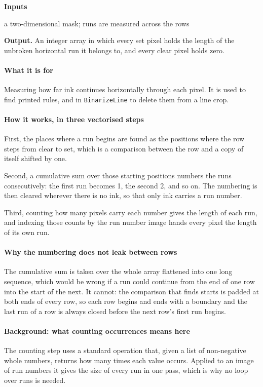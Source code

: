 \noindent\textbf{Inputs}
\begin{description}[leftmargin=2.2em,style=nextline,font=\normalfont\ttfamily]\setlength\itemsep{1pt}
  \item[{mask}] \normalfont a two-dimensional mask; runs are measured across the rows
\end{description}

\noindent\textbf{Output.} An integer array in which every set pixel holds the length of the unbroken horizontal run it belongs to, and every clear pixel holds zero.


\paragraph{What it is for}
Measuring how far ink continues horizontally through each pixel. It is used to find printed rules, and in \texttt{BinarizeLine} to delete them from a line crop.


\paragraph{How it works, in three vectorised steps}
First, the places where a run begins are found as the positions where the row steps from clear to set, which is a comparison between the row and a copy of itself shifted by one.

Second, a cumulative sum over those starting positions numbers the runs consecutively: the first run becomes 1, the second 2, and so on. The numbering is then cleared wherever there is no ink, so that only ink carries a run number.

Third, counting how many pixels carry each number gives the length of each run, and indexing those counts by the run number image hands every pixel the length of its own run.


\paragraph{Why the numbering does not leak between rows}
The cumulative sum is taken over the whole array flattened into one long sequence, which would be wrong if a run could continue from the end of one row into the start of the next. It cannot: the comparison that finds starts is padded at both ends of every row, so each row begins and ends with a boundary and the last run of a row is always closed before the next row's first run begins.


\paragraph{Background: what counting occurrences means here}
The counting step uses a standard operation that, given a list of non-negative whole numbers, returns how many times each value occurs. Applied to an image of run numbers it gives the size of every run in one pass, which is why no loop over runs is needed.


